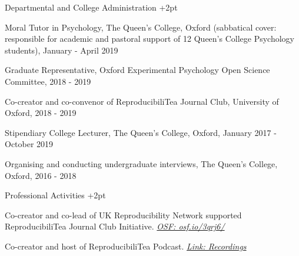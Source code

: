 \documentclass{resume} %
\begin{document}
\begin{rSection}{Departmental and College Administration} \itemsep +2pt

\item Moral Tutor in Psychology, The Queen's College, Oxford (sabbatical cover: responsible for academic and pastoral support of 12 Queen's College Psychology students), January - April 2019

\item Graduate Representative, Oxford Experimental Psychology Open Science Committee, 2018 - 2019

\item Co-creator and co-convenor of ReproducibiliTea Journal Club, University of Oxford, 2018 - 2019

\item Stipendiary College Lecturer, The Queen's College, Oxford, January 2017 - October 2019

\item Organising and conducting undergraduate interviews, The Queen's College, Oxford, 2016 - 2018

\end{rSection}

\begin{rSection}{Professional Activities} \itemsep +2pt

\item Co-creator and  co-lead of UK Reproducibility Network supported ReproducibiliTea Journal Club Initiative. \textit{{\href{https://osf.io/3qrj6/}{OSF: osf.io/3qrj6/}}}

\item Co-creator and host of ReproducibiliTea Podcast. \textit{{\href{https://soundcloud.com/reproducibilitea}{Link: Recordings}}}

\end{rSection}

\end{document}
